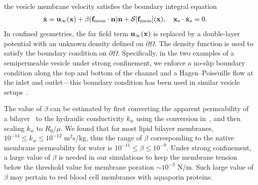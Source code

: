 \documentclass[prb,preprint,showpacs,preprintnumbers,amsmath,amssymb,longbibliography]{revtex4-1}
\begin{document}
%
the vesicle membrane velocity satisfies the boundary integral equation
\begin{align}
  \label{eqn:vesVelocity}
  \dot{\mathbf{x}} &= \mathbf{u}_\infty(\mathbf{x}) + \beta (\mathbf{f}_\mathrm{mem}\cdot\mathbf{n})\mathbf{n}
  + \mathcal{S} [\mathbf{f}_\mathrm{mem}](\mathbf{x}),  \quad
  \mathbf{x}_s \cdot \dot{\mathbf{x}}_s = 0.
\end{align}
In confined geometries, the far field term $\mathbf{u}_\infty(\mathbf{x})$ is replaced
by a double-layer potential with an unknown density defined on
$\partial\Omega$. The density function is used to satisfy the boundary
condition on $\partial\Omega$. Specifically, in the two examples of a semipermeable vesicle under strong confinement, we enforce a
no-slip boundary condition along the top and bottom of the channel and a
Hagen–Poiseuille flow at the inlet and outlet---this boundary condition
has been used in similar vesicle setups~\cite{qua-bir2014,
rah-vee-bir2010, lu-rah-zor2017}. 

The value of $\beta$ can be estimated by first
converting the apparent permeability of a 
bilayer~\cite{OlbrichRawiczNeedhamEtAl2000_BJ} to the hydraulic
conductivity $k_w$ using the conversion
in~\cite{FettiplaceHaydon1980_PhysRev}, and then scaling $k_w$ to $R_0/\mu$. We found that for most lipid bilayer membranes, $10^{-14}\le
k_w\le 10^{-12}$ m$^2$s/kg, thus the range of $\beta$ corresponding to the native membrane permeability for water is $10^{-11}\le
\beta\le 10^{-9}$. 
%
Under strong confinement, a large value of $\beta$ is needed in
our simulations to keep the membrane tension below the threshold value
for membrane poration $\sim 10^{-3}$ N/m. Such large value of $\beta$
may pertain to red blood cell membranes with aquaporin proteins.
\end{document}
